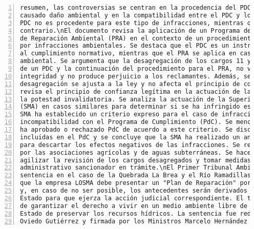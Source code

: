 \begin{Verbatim}[frame=lines, label=Elavoración propia -  Ejemplo de Contexto enviado por el Chatbot a OpenAI
				, fontsize=\scriptsize, numbers=left
				, baselinestretch=0.4
				, formatcom=\color{gray}]
resumen, las controversias se centran en la procedencia del PDC para infracciones que han
causado daño ambiental y en la compatibilidad entre el PDC y los PRA. La SMA argumenta que el
PDC no es procedente para este tipo de infracciones, mientras que las reclamantes sostienen lo
contrario.\nEl documento revisa la aplicación de un Programa de Cumplimiento (PDC) y un Plan
de Reparación Ambiental (PRA) en el contexto de un procedimiento administrativo sancionatorio
por infracciones ambientales. Se destaca que el PDC es un instrumento voluntario de incentivo
al cumplimiento normativo, mientras que el PRA se aplica en casos de infracciones con daño
ambiental. Se argumenta que la desagregación de los cargos 11 y 12, que generó la aprobación
de un PDC y la continuación del procedimiento para el PRA, no vulnera el criterio de
integridad y no produce perjuicio a los reclamantes. Además, se señala que la decisión de
desagregación se ajusta a la ley y no afecta el principio de confianza legítima.\nEl artículo
revisa el principio de confianza legítima en la actuación de la administración como límite a
la potestad invalidatoria. Se analiza la actuación de la Superintendencia del Medio Ambiente
(SMA) en casos similares para determinar si se ha infringido este principio. Se destaca que la
SMA ha establecido un criterio expreso para el caso de infracciones con daño ambiental y su
incompatibilidad con el Programa de Cumplimiento (PdC). Se mencionan casos en los que la SMA
ha aprobado o rechazado PdC de acuerdo a este criterio. Se discute la eficacia de las medidas
incluidas en el PdC y se concluye que la SMA ha realizado un análisis razonable y motivado
para descartar los efectos negativos de las infracciones. Se rechaza la reclamación presentada
por las asociaciones agrícolas y de aguas subterráneas. Se hace un llamado a la SMA para
agilizar la revisión de los cargos desagregados y tomar medidas oportunas en el procedimiento
administrativo sancionador en trámite.\nEl Primer Tribunal Ambiental de Chile emitió una
sentencia en el caso de la Quebrada La Brea y el Río Ramadillas. En la sentencia, se establece
que la empresa LOSMA debe presentar un "Plan de Reparación" por los daños ambientales causados
y, en caso de no ser posible, los antecedentes serán derivados al Consejo de Defensa del
Estado para que ejerza la acción judicial correspondiente. El tribunal destaca la importancia
de garantizar el derecho a vivir en un medio ambiente libre de contaminación y el deber del
Estado de preservar los recursos hídricos. La sentencia fue redactada por el Ministro Mauricio
Oviedo Gutiérrez y firmada por los Ministros Marcelo Hernández Rojas y Juan Opazo Lagos. El

\end{Verbatim}
